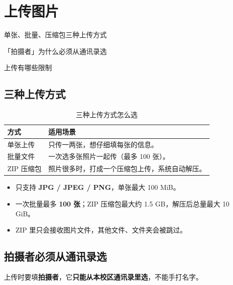 \documentclass[cn,11pt,green]{elegantbook}
\begin{document}
\chapter{上传图片}

\begin{introduction}
  \item 单张、批量、压缩包三种上传方式
  \item 「拍摄者」为什么必须从通讯录选
  \item 上传有哪些限制
\end{introduction}

\section{三种上传方式}

\begin{table}[htbp]
  \centering
  \caption{三种上传方式怎么选}
  \begin{tabular}{L{2.6cm} L{9.6cm}}
    \toprule
    \textbf{方式} & \textbf{适用场景} \\
    \midrule
    单张上传 & 只传一两张，想仔细填每张的信息。 \\
    批量文件 & 一次选多张照片一起传（最多 100 张）。 \\
    ZIP 压缩包 & 照片很多时，打成一个压缩包上传，系统自动解压。 \\
    \bottomrule
  \end{tabular}
\end{table}

\begin{notebox}[上传的限制]
  \begin{itemize}
    \item 只支持 \textbf{JPG / JPEG / PNG}，单张最大 100 MiB。
    \item 一次批量最多 \textbf{100 张}；ZIP 压缩包最大约 1.5 GB，解压后总量最大 10 GiB。
    \item ZIP 里只会接收图片文件，其他文件、文件夹会被跳过。
  \end{itemize}
\end{notebox}

\section{拍摄者必须从通讯录选}

上传时要填\textbf{拍摄者}，它\textbf{只能从本校区通讯录里选}，不能手打名字。
\end{document}
